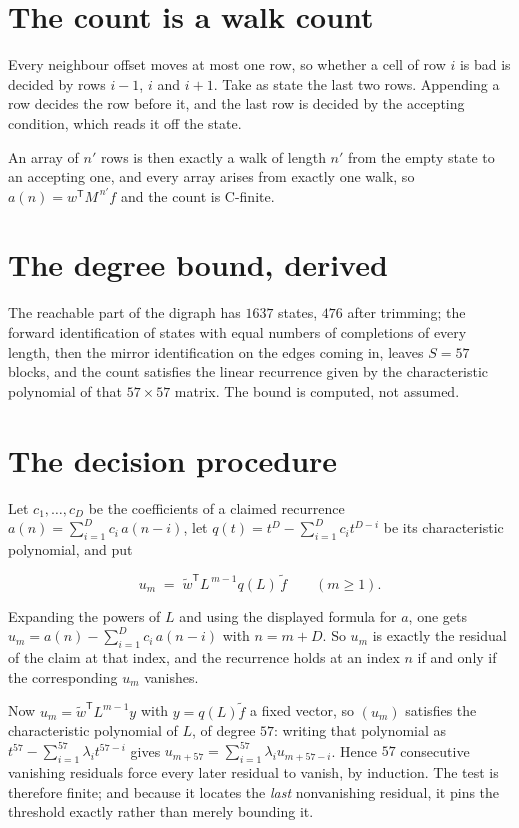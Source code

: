 \documentclass[11pt]{article}
\theoremstyle{definition}
\begin{document}
\section{The count is a walk count}

Every neighbour offset moves at most one row, so whether a cell of row $i$ is bad is decided by rows $i-1$, $i$ and $i+1$. Take as state the last two rows. Appending a row decides the row before it, and the last row is decided by the accepting condition, which reads it off the state.

An array of $n'$ rows is then exactly a walk of length $n'$ from the empty state to an accepting one, and every array arises from exactly one walk, so $a(n) = w^{\mathsf T}M^{\,n'}f$ and the count is C-finite.

\section{The degree bound, derived}

The reachable part of the digraph has $1637$ states, $476$ after trimming; the forward identification of states with equal numbers of completions of every length, then the mirror identification on the edges coming in, leaves $S = 57$ blocks, and the count satisfies the linear recurrence given by the characteristic polynomial of that $57\times57$ matrix. The bound is computed, not assumed.

\section{The decision procedure}

Let $c_1,\dots,c_D$ be the coefficients of a claimed recurrence $a(n) = \sum_{i=1}^{D} c_i\,a(n-i)$, let $q(t) = t^{D} - \sum_{i=1}^{D} c_i t^{D-i}$ be its characteristic polynomial, and put

\[u_m \;=\; \tilde w^{\mathsf T} L^{\,m-1} q(L)\,\tilde f \qquad (m \ge 1).\]

Expanding the powers of $L$ and using the displayed formula for $a$, one gets $u_m = a(n) - \sum_{i=1}^{D} c_i\,a(n-i)$ with $n = m + D$. So $u_m$ is exactly the residual of the claim at that index, and the recurrence holds at an index $n$ if and only if the corresponding $u_m$ vanishes.

Now $u_m = \tilde w^{\mathsf T} L^{m-1} y$ with $y = q(L)\tilde f$ a fixed vector, so $(u_m)$ satisfies the characteristic polynomial of $L$, of degree $57$: writing that polynomial as $t^{57} - \sum_{i=1}^{57} \lambda_i t^{57-i}$ gives $u_{m+57} = \sum_{i=1}^{57} \lambda_i u_{m+57-i}$. Hence $57$ consecutive vanishing residuals force every later residual to vanish, by induction. The test is therefore finite; and because it locates the {\itshape last} nonvanishing residual, it pins the threshold exactly rather than merely bounding it.
\end{document}
